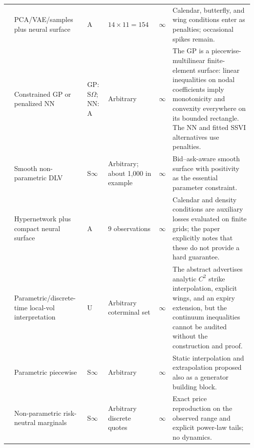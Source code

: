 \documentclass[11pt,a4paper]{article}
\begin{document}
\begin{landscape}
\begin{table}[p]
\begin{tabular}{@{}p{4.5cm}p{3.3cm}p{1.45cm}p{2.9cm}p{2.0cm}p{8.0cm}@{}}
\citet{ZhangLiZhang2021}
  & PCA/VAE/samples plus neural surface & A & $14\times11=154$ & $\infty$
  & Calendar, butterfly, and wing conditions enter as penalties; occasional spikes remain. \\
\citet{ChataignerEtAl2022}
  & Constrained GP or penalized NN & GP: S$\Omega$; NN: A & Arbitrary & $\infty$
  & The GP is a piecewise-multilinear finite-element surface: linear inequalities on nodal coefficients imply monotonicity and convexity everywhere on its bounded rectangle.  The NN and fitted SSVI alternatives use penalties. \\
\citet{SANOS2026}
  & Smooth non-parametric DLV & S$\infty$ & Arbitrary; about 1,000 in example & $\infty$
  & Bid--ask-aware smooth surface with positivity as the essential parameter constraint. \\
\citet{YangChenShuHospedales2025}
  & Hypernetwork plus compact neural surface & A & 9 observations & $\infty$
  & Calendar and density conditions are auxiliary losses evaluated on finite grids; the paper explicitly notes that these do not provide a hard guarantee. \\
\citet{Roos2025}
  & Parametric/discrete-time local-vol interpretation & U & Arbitrary coterminal set & $\infty$
  & The abstract advertises analytic $C^2$ strike interpolation, explicit wings, and an expiry extension, but the continuum inequalities cannot be audited without the construction and proof. \\
\citet{Schlenkrich2025}
  & Parametric piecewise & S$\infty$ & Arbitrary & $\infty$
  & Static interpolation and extrapolation proposed also as a generator building block. \\
\citet{QinYangCheFeng2026}
  & Non-parametric risk-neutral marginals & S$\infty$ & Arbitrary discrete quotes & $\infty$
  & Exact price reproduction on the observed range and explicit power-law tails; no dynamics. \\
\bottomrule
\end{tabular}
\end{table}
\end{landscape}
\end{document}
